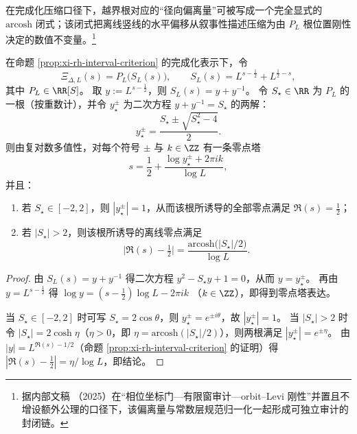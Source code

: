 在完成化压缩口径下，越界根对应的“径向偏离量”可被写成一个完全显式的 \(\mathrm{arcosh}\) 闭式；该闭式把离线竖线的水平偏移从叙事性描述压缩为由 \(P_L\) 根位置刚性决定的数值不变量。\footnote{据内部文稿 \cite{Internal2025ResolutionFoldingPhiPi}（2025）在“相位坐标门—有限窗审计—orbit--Levi 刚性”并置且不增设额外公理的口径下，该偏离量与常数层规范归一化一起形成可独立审计的封闭链。}

\begin{corollary}\label{cor:xi-single-scale-radial-deviation-arcosh}
在命题 \ref{prop:xi-rh-interval-criterion} 的完成化表示下，令
\[
\Xi_{\Delta,L}(s)=P_L\!\bigl(S_L(s)\bigr),\qquad S_L(s)=L^{s-\frac12}+L^{\frac12-s},
\]
其中 \(P_L\in\RR[S]\)。
取 \(y:=L^{s-\frac12}\)，则 \(S_L(s)=y+y^{-1}\)。
令 \(S_\star\in\RR\) 为 \(P_L\) 的一根（按重数计），并令 \(y_\star^{\pm}\) 为二次方程 \(y+y^{-1}=S_\star\) 的两解：
\[
y_\star^{\pm}=\frac{S_\star\pm\sqrt{S_\star^2-4}}{2}.
\]
则由复对数多值性，对每个符号 \(\pm\) 与 \(k\in\ZZ\) 有一条零点塔
\[
s=\frac12+\frac{\log y_\star^{\pm}+2\pi i k}{\log L},
\]
并且：
\begin{enumerate}
  \item 若 \(S_\star\in[-2,2]\)，则 \(|y_\star^\pm|=1\)，从而该根所诱导的全部零点满足 \(\Re(s)=\tfrac12\)；
  \item 若 \(|S_\star|>2\)，则该根所诱导的离线零点满足
  \[
  \bigl|\Re(s)-\tfrac12\bigr|
  =\frac{\mathrm{arcosh}\bigl(|S_\star|/2\bigr)}{\log L}.
  \]
\end{enumerate}
\end{corollary}

\begin{proof}
由 \(S_L(s)=y+y^{-1}\) 得二次方程 \(y^2-S_\star y+1=0\)，从而 \(y=y_\star^\pm\)。
再由 \(y=L^{s-\frac12}\) 得
\(
\log y=(s-\frac12)\log L-2\pi i k
\)
（\(k\in\ZZ\)），即得到零点塔表达。
\par
当 \(S_\star\in[-2,2]\) 时可写 \(S_\star=2\cos\theta\)，则 \(y_\star^\pm=e^{\pm i\theta}\)，故 \(|y_\star^\pm|=1\)。
当 \(|S_\star|>2\) 时令 \(|S_\star|=2\cosh\eta\)（\(\eta>0\)，即 \(\eta=\mathrm{arcosh}(|S_\star|/2)\)），则两根满足 \(|y_\star^\pm|=e^{\pm\eta}\)。
由 \(|y|=L^{\Re(s)-1/2}\)（命题 \ref{prop:xi-rh-interval-criterion} 的证明）得
\(
|\Re(s)-\tfrac12|
=\eta/\log L
\)，即结论。
\end{proof}
